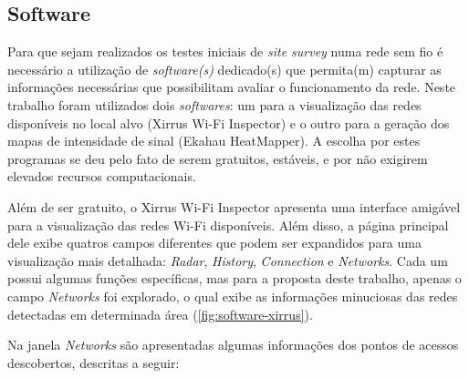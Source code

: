 \subsection{Software}
\label{subsec:softwares-utiliados}

Para que sejam realizados os testes iniciais de \textit{site survey} numa rede sem fio é necessário a utilização de \textit{software(s)} dedicado(s) que permita(m) capturar as informações necessárias que possibilitam avaliar o funcionamento da rede. Neste trabalho foram utilizados dois \textit{softwares}: um para a visualização das redes disponíveis no local alvo (Xirrus Wi-Fi Inspector) e o outro para a geração dos mapas de intensidade de sinal (Ekahau HeatMapper). A escolha por estes programas se deu pelo fato de serem gratuitos, estáveis, e por não exigirem elevados recursos computacionais.

Além de ser gratuito, o Xirrus Wi-Fi Inspector apresenta uma interface amigável para a visualização das redes Wi-Fi disponíveis. Além disso, a página principal dele exibe quatros campos diferentes que podem ser expandidos para uma visualização mais detalhada: \textit{Radar}, \textit{History}, \textit{Connection} e \textit{Networks}. Cada um possui algumas funções específicas, mas para a proposta deste trabalho, apenas o campo \textit{Networks} foi explorado, o qual exibe as informações minuciosas das redes detectadas em determinada área (\autoref{fig:software-xirrus}).

\begin{figure}[H]
	\centering
\end{figure}

Na janela \textit{Networks} são apresentadas algumas informações dos pontos de acessos descobertos, descritas a seguir:

